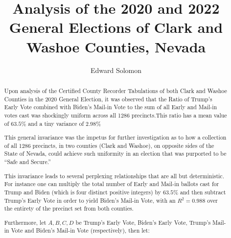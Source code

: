 \documentclass[preprint,13pt]{elsarticle}
\begin{document}
\begin{frontmatter}



\title{Analysis of the 2020 and 2022 General Elections of Clark and Washoe Counties, Nevada}
\author{Edward Solomon}
\begin{abstract}
Upon analysis of the Certified County Recorder Tabulations of both Clark and Washoe Counties in the 2020 General Election, it was observed that the Ratio of Trump’s Early Vote combined with Biden’s Mail-in Vote to the sum of all Early and Mail-in votes cast was shockingly uniform across all 1286 precincts.This ratio has a mean value of $63.5\%$ and a tiny variance of $2.98\%$

This general invariance was the impetus for further investigation as to how a collection of all 1286 precincts, in two counties (Clark and Washoe), on opposite sides of the State of Nevada, could achieve such uniformity in an election that was purported to be “Safe and Secure.”

This invariance leads to several perplexing relationships that are all but deterministic. For instance one can multiply the total number of Early and Mail-in ballots cast for Trump and Biden (which is four distinct positive integers) by $63.5\%$ and then subtract Trump's Early Vote in order to yield Biden's Mail-in Vote, with an $R^2=0.988$ over the entirety of the precinct set from both counties.

Furthermore, let $A, B, C, D$ be Trump's Early Vote, Biden's Early Vote, Trump's Mail-in Vote and Biden's Mail-in Vote (respectively), then let:


\end{abstract}
\end{frontmatter}
\end{document}
